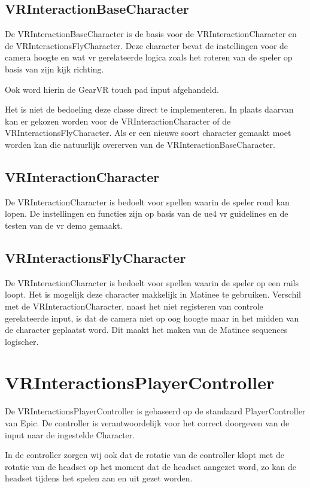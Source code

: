\subsection{VRInteractionBaseCharacter}
De VRInteractionBaseCharacter is de basis voor de VRInteractionCharacter en de VRInteractionsFlyCharacter. Deze character bevat de instellingen voor de camera hoogte en wat \gls{vr} gerelateerde logica zoals het roteren van de speler op basis van zijn kijk richting.

Ook word hierin de GearVR touch pad input afgehandeld.

Het is niet de bedoeling deze classe direct te implementeren. In plaats daarvan kan er gekozen worden voor de VRInteractionCharacter of de VRInteractionsFlyCharacter. Als er een nieuwe soort character gemaakt moet worden kan die natuurlijk overerven van de VRInteractionBaseCharacter.

\subsection{VRInteractionCharacter}
De VRInteractionCharacter is bedoelt voor spellen waarin de speler rond kan lopen. De instellingen en functies zijn op basis van de \gls{ue4} \gls{vr} guidelines en de testen van de \gls{vr} demo gemaakt.

\subsection{VRInteractionsFlyCharacter}
De VRInteractionCharacter is bedoelt voor spellen waarin de speler op een rails loopt. Het is mogelijk deze character makkelijk in Matinee te gebruiken. Verschil met de VRInteractionCharacter, naast het niet registeren van controle gerelateerde input, is dat de camera niet op oog hoogte maar in het midden van de character geplaatst word. Dit maakt het maken van de Matinee sequences logischer.

\section{VRInteractionsPlayerController}
De VRInteractionsPlayerController is gebaseerd op de standaard PlayerController van Epic. De controller is verantwoordelijk voor het correct doorgeven van de input naar de ingestelde Character.

In de controller zorgen wij ook dat de rotatie van de controller klopt met de rotatie van de headset op het moment dat de headset aangezet word, zo kan de headset tijdens het spelen aan en uit gezet worden.

